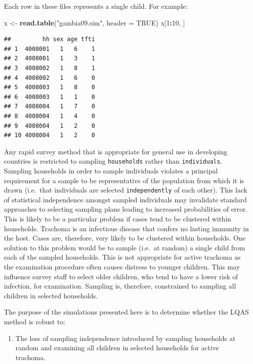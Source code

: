 \documentclass[12pt,a4paper]{book}
\newenvironment{Shaded}{\begin{snugshade}}{\end{snugshade}}
\newcommand{\KeywordTok}[1]{\textcolor[rgb]{0.13,0.29,0.53}{\textbf{#1}}}
\newcommand{\DataTypeTok}[1]{\textcolor[rgb]{0.13,0.29,0.53}{#1}}
\newcommand{\DecValTok}[1]{\textcolor[rgb]{0.00,0.00,0.81}{#1}}
\newcommand{\StringTok}[1]{\textcolor[rgb]{0.31,0.60,0.02}{#1}}
\newcommand{\OtherTok}[1]{\textcolor[rgb]{0.56,0.35,0.01}{#1}}
\newcommand{\OperatorTok}[1]{\textcolor[rgb]{0.81,0.36,0.00}{\textbf{#1}}}
\newcommand{\NormalTok}[1]{#1}
\providecommand{\tightlist}{%
  \setlength{\itemsep}{0pt}\setlength{\parskip}{0pt}}
\theoremstyle{definition}
\theoremstyle{definition}
\theoremstyle{definition}
\theoremstyle{remark}
\begin{document}
Each row in these files represents a single child. For example:

\begin{Shaded}
\begin{Highlighting}[]
\NormalTok{x <-}\StringTok{ }\KeywordTok{read.table}\NormalTok{(}\StringTok{"gambia09.sim"}\NormalTok{, }\DataTypeTok{header =} \OtherTok{TRUE}\NormalTok{)}
\NormalTok{x[}\DecValTok{1}\OperatorTok{:}\DecValTok{10}\NormalTok{, ]}
\end{Highlighting}
\end{Shaded}

\begin{verbatim}
##         hh sex age tfti
## 1  4008001   1   6    1
## 2  4008001   1   3    1
## 3  4008002   1   8    1
## 4  4008002   1   6    0
## 5  4008003   1   8    0
## 6  4008003   1   1    0
## 7  4008004   1   7    0
## 8  4008004   1   4    0
## 9  4008004   1   2    0
## 10 4008004   1   2    0
\end{verbatim}

Any rapid survey method that is appropriate for general use in
developing countries is restricted to sampling \texttt{households}
rather than \texttt{individuals}. Sampling households in order to sample
individuals violates a principal requirement for a sample to be
representative of the population from which it is drawn (i.e.~that
individuals are selected \texttt{independently} of each other). This
lack of statistical independence amongst sampled individuals may
invalidate standard approaches to selecting sampling plans leading to
increased probabilities of error. This is likely to be a particular
problem if cases tend to be clustered within households. Trachoma is an
infectious disease that confers no lasting immunity in the host. Cases
are, therefore, very likely to be clustered within households. One
solution to this problem would be to sample (i.e.~at random) a single
child from each of the sampled households. This is not appropriate for
active trachoma as the examination procedure often causes distress to
younger children. This may influence survey staff to select older
children, who tend to have a lower risk of infection, for examination.
Sampling is, therefore, constrained to sampling all children in selected
households.

The purpose of the simulations presented here is to determine whether
the LQAS method is robust to:

\begin{enumerate}
\def\labelenumi{\arabic{enumi}.}
\tightlist
\item
  The loss of sampling independence introduced by sampling households at
  random and examining all children in selected households for active
  trachoma.
\end{enumerate}
\end{document}

